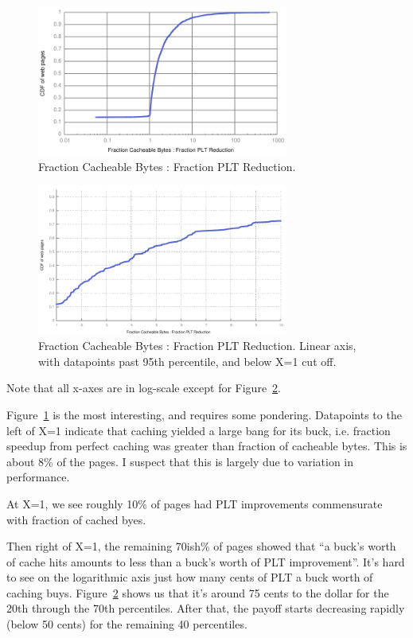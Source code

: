 \begin{figure}[t]
    \includegraphics[width=3.25in]{../graphs/ratio_bytes_to_reduction/ratio.pdf}
    \caption[]{\label{fig:ratio} Fraction Cacheable Bytes : Fraction PLT
    Reduction.}
\end{figure}

\begin{figure}[t]
    \includegraphics[width=3.25in]{../graphs/ratio_bytes_to_reduction/ratio_linear.pdf}
    \caption[]{\label{fig:ratio_linear} Fraction Cacheable Bytes : Fraction PLT
    Reduction. Linear axis, with datapoints past 95th percentile, and below
    X=1 cut off.}
\end{figure}

Note that all x-axes are in log-scale except for
Figure~\ref{fig:ratio_linear}.

Figure~\ref{fig:ratio} is the most interesting, and requires some pondering.
Datapoints to the left of X=1 indicate that caching yielded a large
bang for its buck, i.e. fraction speedup from perfect caching was greater than fraction of
cacheable bytes. This is about 8\% of the pages. I suspect that this is
largely due to
variation in performance.

At X=1, we see roughly 10\% of pages had PLT improvements commensurate with
fraction of cached byes.

Then right of X=1, the remaining 70ish\% of pages showed that ``a buck's worth
of cache hits amounts to less than a buck's worth of PLT improvement''. It's
hard to see on the logarithmic axis just how many cents of PLT a buck worth of
caching buys. Figure~\ref{fig:ratio_linear} shows us that it's around 75 cents
to the dollar for the 20th through the 70th percentiles. After that, the
payoff starts decreasing rapidly (below 50 cents) for the remaining 40 percentiles.
